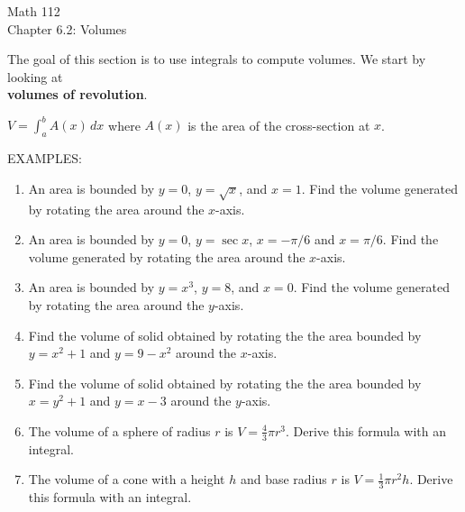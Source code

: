 \documentclass[11pt]{article}
\begin{document}
\begin{center}
\Large
\rm{Math 112}
\\
\rm{Chapter 6.2:  Volumes}
\\
\end{center}
\vspace{0.2in}

The goal of this section is to use integrals to compute volumes.  We
start by looking at \\ {\bf volumes of revolution}.\\

\vspace{3in}

$V = \int_a^b A(x) \, dx$   where $A(x)$ is the area of the cross-section at $x$.

\vspace{0.5in}


EXAMPLES: 

\begin{enumerate}
  \item{An area is bounded by $y=0$, $y=\sqrt{x}$, and $x=1$.  Find the volume generated by rotating the area around the $x$-axis.}


  \pagebreak

\item{An area is bounded by $y=0$, $y=\sec{x}$, $x=-\pi/6$ and $x=\pi/6$.  Find the volume generated by rotating the area around the $x$-axis.}

  \vspace{4in}


\item{An area is bounded by $y=x^3$, $y=8$, and $x=0$.  Find the volume generated by rotating the area around the $y$-axis.}  


\pagebreak

\item{Find the volume of solid obtained by rotating the the area bounded by $y=x^2+1$ and  $y=9-x^2$ around the $x$-axis.}  


  \vspace{4in}


\item{Find the volume of solid obtained by rotating the the area bounded by $x=y^2+1$ and  $y=x-3$ around the $y$-axis.}

  \pagebreak

\item{The volume of a sphere of radius $r$ is $V=\frac43 \pi r^3$.  Derive this formula with an integral.}

  \vspace{4in}


\item{The volume of a cone with a height $h$ and base radius $r$ is $V=\frac13 \pi r^2h$.  Derive this formula with an integral.}  

  \pagebreak

  
\end{enumerate}
\end{document}
